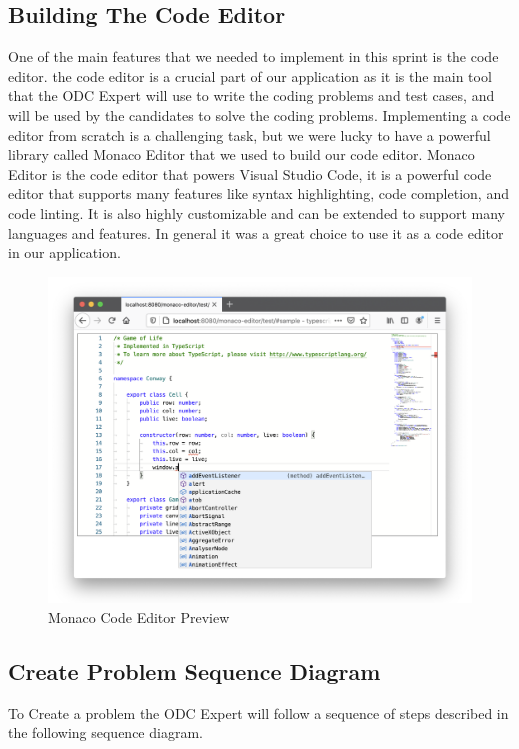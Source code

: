 \newpage
\subsection{Building The Code Editor}
One of the main features that we needed to implement in this sprint is the code editor.
the code editor is a crucial part of our application as it is the main tool that the ODC Expert will use
to write the coding problems and test cases, and will be used by the candidates to solve the coding problems.
Implementing a code editor from scratch is a challenging task, but we were lucky to have a powerful library
called Monaco Editor that we used to build our code editor. Monaco Editor is the code editor that powers Visual Studio Code,
it is a powerful code editor that supports many features like syntax highlighting, code completion, and code linting.
It is also highly customizable and can be extended to support many languages and features. In general it was a great choice
to use it as a code editor in our application.

\begin{figure}[h]
  \centering
  \includegraphics[width=1\textwidth]{images/monaco.png}
  \caption{Monaco Code Editor Preview}\label{Monaco Code Editor Preview}
\end{figure}

\subsection{Create Problem Sequence Diagram}
To Create a problem the ODC Expert will follow a sequence of steps described in the following sequence diagram.

